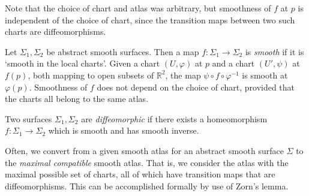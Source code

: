 \begin{remark}
	Note that the choice of chart and atlas was arbitrary, but smoothness of $f$ at $p$ is independent of the choice of chart, since the transition maps between two such charts are diffeomorphisms.
\end{remark}
\begin{definition}
	Let $\Sigma_1, \Sigma_2$ be abstract smooth surfaces.
	Then a map $f \colon \Sigma_1 \to \Sigma_2$ is \textit{smooth} if it is `smooth in the local charts'.
	Given a chart $(U, \varphi)$ at $p$ and a chart $(U', \psi)$ at $f(p)$, both mapping to open subsets of $\mathbb R^2$, the map $\psi \circ f \circ \varphi^{-1}$ is smooth at $\varphi(p)$.
	Smoothness of $f$ does not depend on the choice of chart, provided that the charts all belong to the same atlas.
\end{definition}
\begin{definition}
	Two surfaces $\Sigma_1, \Sigma_2$ are \textit{diffeomorphic} if there exists a homeomorphism $f \colon \Sigma_1 \to \Sigma_2$ which is smooth and has smooth inverse.
\end{definition}
\begin{remark}
	Often, we convert from a given smooth atlas for an abstract smooth surface $\Sigma$ to the \textit{maximal compatible} smooth atlas.
	That is, we consider the atlas with the maximal possible set of charts, all of which have transition maps that are diffeomorphisms.
	This can be accomplished formally by use of Zorn's lemma.
\end{remark}
